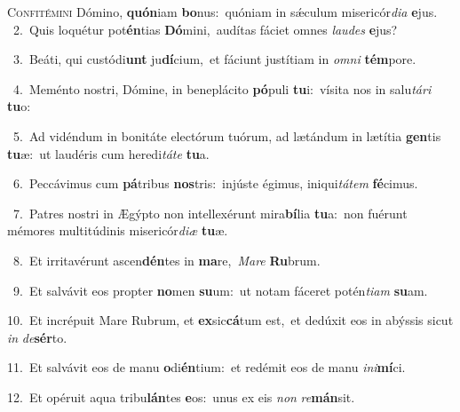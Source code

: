 \lettrine{\initial\textcolor{\initialcolor}{C}}{onfitémini} Dómino, \textbf{quón}\-iam \textbf{bo}\-nus:~\star quóniam in sǽculum misericór\-\textit{di}\-\textit{a} \textbf{e}\-jus.\\
{\numbfont\textcolor{\numbcolor}{~2.}}~Quis loquétur pot\-\textbf{én}\-tias \textbf{Dó}\-mini,~\star audítas fáciet omnes \textit{lau}\-\textit{des} \textbf{e}\-jus?\par
{\numbfont\textcolor{\numbcolor}{~3.}}~Beáti, qui custódi\textbf{unt} ju\-\textbf{dí}\-cium,~\star et fáciunt justítiam in \textit{om}\-\textit{ni} \textbf{tém}\-pore.\par
{\numbfont\textcolor{\numbcolor}{~4.}}~Meménto nostri, Dómine, in beneplácito \textbf{pó}\-puli \textbf{tu}\-i:~\star vísita nos in salu\-\textit{tá}\-\textit{ri} \textbf{tu}\-o:\par
{\numbfont\textcolor{\numbcolor}{~5.}}~Ad vidéndum in bonitáte electórum tuórum, ad lætándum in lætítia \textbf{gen}\-tis \textbf{tu}\-æ:~\star ut laudéris cum heredi\-\textit{tá}\-\textit{te} \textbf{tu}\-a.\par
{\numbfont\textcolor{\numbcolor}{~6.}}~Peccávimus cum \textbf{pá}\-tribus \textbf{nos}\-tris:~\star injúste égimus, iniqui\-\textit{tá}\-\textit{tem} \textbf{fé}\-cimus.\par
{\numbfont\textcolor{\numbcolor}{~7.}}~Patres nostri in Ægýpto non intellexérunt mira\-\textbf{bí}\-lia \textbf{tu}\-a:~\star non fuérunt mémores multitúdinis misericór\-\textit{di}\-\textit{æ} \textbf{tu}\-æ.\par
{\numbfont\textcolor{\numbcolor}{~8.}}~Et irritavérunt ascen\-\textbf{dén}\-tes in \textbf{ma}\-re,~\star \textit{Ma}\-\textit{re} \textbf{Ru}\-brum.\par
{\numbfont\textcolor{\numbcolor}{~9.}}~Et salvávit eos propter \textbf{no}\-men \textbf{su}\-um:~\star ut notam fáceret potén\-\textit{ti}\-\textit{am} \textbf{su}\-am.\par
{\numbfont\textcolor{\numbcolor}{10.}}~Et incrépuit Mare Rubrum, et \textbf{ex}\-sic\-\textbf{cá}\-tum est,~\star et dedúxit eos in abýssis sicut \textit{in} \textit{de}\-\textbf{sér}to.\par
{\numbfont\textcolor{\numbcolor}{11.}}~Et salvávit eos de manu \textbf{o}\-di\-\textbf{én}\-tium:~\star et redémit eos de manu \textit{in}\-\textit{i}\textbf{mí}ci.\par
{\numbfont\textcolor{\numbcolor}{12.}}~Et opéruit aqua tribu\-\textbf{lán}\-tes \textbf{e}\-os:~\star unus ex eis \textit{non} \textit{re}\-\textbf{mán}sit.\par

